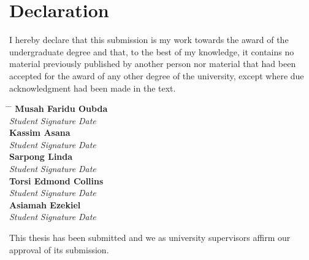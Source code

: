 \documentclass[12pt]{report} %
\begin{document}
\chapter*{Declaration}

\vspace{1cm}

I hereby declare that this submission is my work towards the award of the undergraduate degree and that, to the best of my knowledge, it contains no material previously published by another person nor material that had been accepted for the award of any other degree of the university, except where due acknowledgment had been made in the text.

\vspace{2cm}

\begin{tabbing}
    \hspace{6cm} \= \hspace{4cm} \= \hspace{5cm} \kill
    \textbf{Musah Faridu Oubda} \> \makebox[4cm]{\dotfill} \> \makebox[4cm]{\dotfill} \\
    \textit{Student} \> \textit{Signature} \> \textit{Date} \\[1.5cm]
    \textbf{Kassim Asana} \> \makebox[3cm]{\dotfill} \> \makebox[3cm]{\dotfill} \\
    \textit{Student} \> \textit{Signature} \> \textit{Date} \\[1.5cm]
    \textbf{Sarpong Linda} \> \makebox[3cm]{\dotfill} \> \makebox[3cm]{\dotfill} \\
    \textit{Student} \> \textit{Signature} \> \textit{Date} \\[1.5cm]
    \textbf{Torsi Edmond Collins} \> \makebox[3cm]{\dotfill} \> \makebox[3cm]{\dotfill} \\
    \textit{Student} \> \textit{Signature} \> \textit{Date} \\[1.5cm]
    \textbf{Asiamah Ezekiel} \> \makebox[3cm]{\dotfill} \> \makebox[3cm]{\dotfill} \\
    \textit{Student} \> \textit{Signature} \> \textit{Date} \\[1.5cm]
\end{tabbing}
This thesis has been submitted and we as university supervisors affirm our approval of
its submission.\\
\end{document}
